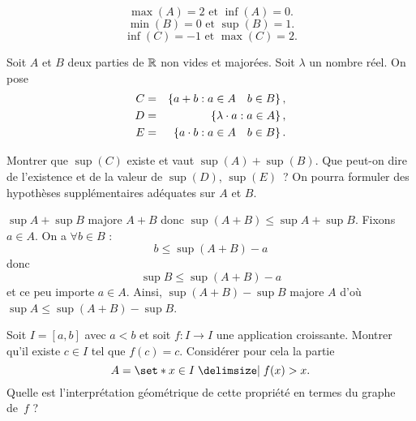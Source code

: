 \documentclass{magnolia}
\begin{document}
\begin{sol}
$$\max(A)=2 \text{ et } \inf(A)=0.$$
$$\min(B)=0 \text{ et } \sup(B)=1.$$
$$\inf(C)=-1 \text{ et } \max(C)=2.$$

\end{sol}


Soit $A$ et $B$ deux parties de $\mathbb{R}$ non vides et majorées. Soit $\lambda$
un nombre réel. On pose
\begin{eqnarray*}
C&=&\left\{a+b : a\in A \quad b\in B\right\},\\
D&=&\left\{\lambda\cdot a : a\in A\right\},\\
E&=&\left\{a\cdot b : a\in A \quad b\in B\right\}.
\end{eqnarray*}
\begin{questions}
\question Montrer que $\sup(C)$ existe et vaut $\sup(A)+\sup(B)$. 
\question Que peut-on dire de l'existence et de la valeur de $\sup(D)$,
  $\sup(E)$~? On pourra formuler des hypothèses supplémentaires adéquates sur $A$
  et $B$.
\end{questions}

\begin{sol}
\begin{questions}
\question$\sup A+\sup B$ majore $A+B$ donc $\sup(A+B)\leq \sup A+\sup B$.
Fixons $a\in A$. On a $\forall b\in B$ :
$$b\leq \sup(A+B)-a$$ donc $$\sup B \leq \sup(A+B)-a$$ et ce peu importe $a\in A$. Ainsi, $\sup(A+B)-\sup B$ majore $A$ d'où $\sup A\leq \sup(A+B)-\sup B$.
\question 
\end{questions}
\end{sol}

Soit $I=[a,b]$ avec $a<b$ et soit $f:I\rightarrow I$ une application
croissante. Montrer qu'il existe $c\in I$ tel que $f(c)=c$. Considérer pour
cela la partie 
$$A=\enstq{x\in I}{f(x)>x}.$$ 
Quelle est l'interprétation géométrique de cette propriété en termes du graphe
de~$f$ ?
\end{document}
